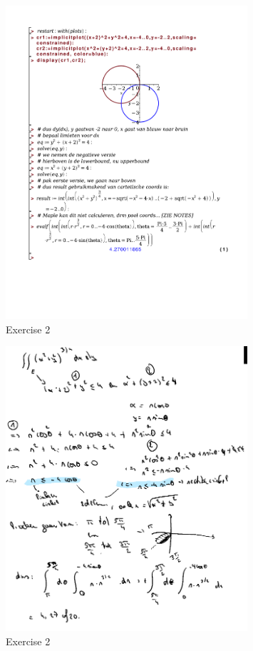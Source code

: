 \documentclass[a4paper]{report}
\begin{document}
\begin{figure}[H]
	\centering
	\includegraphics[width=0.8\textwidth]{exercises/bord_5_ex_2.pdf}
	\caption{Exercise 2}
	\label{fig:bord_5_ex_2_maple}
\end{figure}

\begin{figure}[H]
	\centering
	\includegraphics[width=0.8\textwidth]{assets/bord_5_ex_2.png}
	\caption{Exercise 2}
	\label{fig:bord_5_ex_2}
\end{figure}
\end{document}
